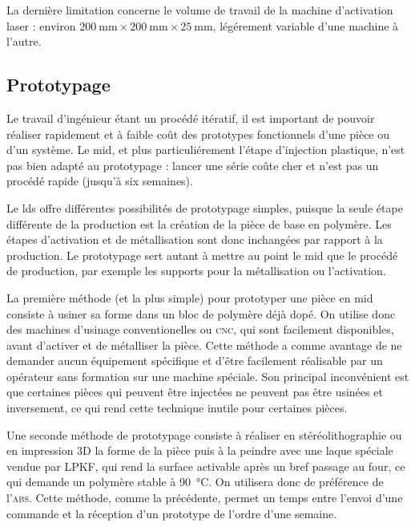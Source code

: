 
La dernière limitation concerne le volume de travail de la machine d'activation laser : environ $\SI{200}{\milli\meter}\times\SI{200}{\milli\meter}\times\SI{25}{\milli\meter}$, légérement variable d'une machine à l'autre.

\subsection{Prototypage}
Le travail d'ingénieur étant un procédé itératif, il est important de pouvoir réaliser rapidement et à faible coût des prototypes fonctionnels d'une pièce ou d'un système.
Le \gls{mid}, et plus particuliérement l'étape d'injection plastique, n'est pas bien adapté au prototypage : lancer une série coûte cher et n'est pas un procédé rapide (jusqu'à six semaines).

Le \gls{lds} offre différentes possibilités de prototypage simples, puisque la seule étape différente de la production est la création de la pièce de base en polymère.
Les étapes d'activation et de métallisation sont donc inchangées par rapport à la production.
Le prototypage sert autant à mettre au point le \gls{mid} que le procédé de production, par exemple les supports pour la métallisation ou l'activation.

La première méthode (et la plus simple) pour prototyper une pièce en \gls{mid} consiste à usiner sa forme dans un bloc de polymère déjà dopé.
On utilise donc des machines d'usinage conventionelles ou \textsc{cnc}, qui sont facilement disponibles, avant d'activer et de métalliser la pièce.
Cette méthode a comme avantage de ne demander aucun équipement spécifique et d'être facilement réalisable par un opérateur sans formation sur une machine spéciale.
Son principal inconvénient est que certaines pièces qui peuvent être injectées ne peuvent pas être usinées et inversement, ce qui rend cette technique inutile pour certaines pièces.

Une seconde méthode de prototypage consiste à réaliser en stéréolithographie ou en impression 3D la forme de la pièce puis à la peindre avec une laque spéciale vendue par LPKF, qui rend la surface activable après un bref passage au four, ce qui demande un polymère stable à \SI{90}{\celsius}.
On utilisera donc de préférence de l'\textsc{abs}.
Cette méthode, comme la précédente, permet un temps entre l'envoi d'une commande et la réception d'un prototype de l'ordre d'une semaine.

